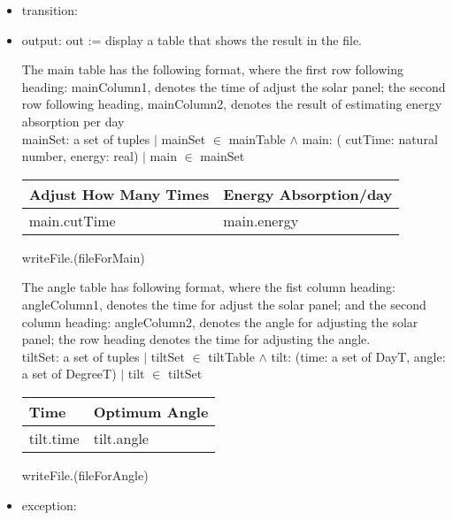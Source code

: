\documentclass[12pt, titlepage]{article}
\begin{document}
\begin{itemize}
\item transition:
\item output: out := display a table that shows the result in the file.

The main table has the following format, where the first row following heading: mainColumn1, denotes the time of adjust the solar panel; the second row following heading, mainColumn2, denotes the result of estimating energy absorption per day\\

mainSet: a set of tuples $|$ mainSet $\in$ mainTable $\wedge$ main: ( 
cutTime: natural number, energy: real) $|$ main $\in$ mainSet\\


\begin{center}
\begin{tabular}{|p{5cm}|p{5cm}|}

\hline 
Adjust How Many Times & Energy Absorption/day \\
\hline 
main.cutTime & main.energy    \\
\hline 
\end{tabular}
\end{center}

writeFile.(fileForMain)


The angle table has following format,  where the fist column heading: angleColumn1, denotes the time for adjust the solar panel; and the second column heading: angleColumn2, denotes the angle for adjusting the solar panel; the row heading denotes the time for adjusting the angle.\\


tiltSet: a set of tuples $|$ tiltSet $\in$ tiltTable $\wedge$ tilt: (time: a set of DayT,  angle: a set of DegreeT)  $|$ tilt $\in$ tiltSet \ \\

\begin{center}
\begin{tabular}{|p{4.5cm}|p{4cm}|}

\hline 
  Time & Optimum Angle   \\
\hline 
tilt.time & tilt.angle \\
\hline 
\end{tabular}
\end{center}
writeFile.(fileForAngle)

\item exception: 
\end{itemize}
\end{document}
